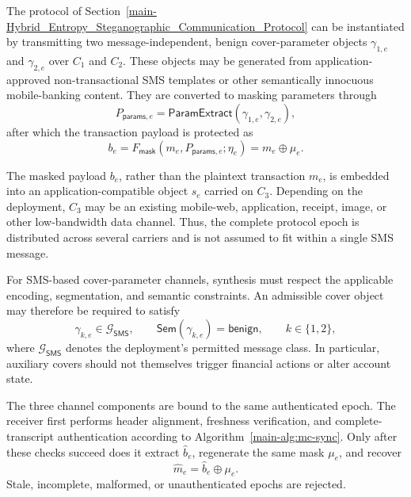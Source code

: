 \documentclass[journal]{IEEEtran}
\theoremstyle{definition}
\theoremstyle{game}
\begin{document}
The protocol of
Section~\ref{main-Hybrid_Entropy_Steganographic_Communication_Protocol}
can be instantiated by transmitting two message-independent,
benign cover-parameter objects
$\gamma_{1,e}$ and $\gamma_{2,e}$ over $C_1$ and $C_2$.
These objects may be generated from application-approved
non-transactional SMS templates or other semantically innocuous
mobile-banking content. They are converted to masking parameters
through
\begin{equation}
P_{\mathsf{params},e}
=
\mathsf{ParamExtract}
\left(
\gamma_{1,e},\gamma_{2,e}
\right),
\end{equation}
after which the transaction payload is protected as
\begin{equation}
b_e
=
F_{\mathsf{mask}}
\left(
m_e,P_{\mathsf{params},e};\eta_e
\right)
=
m_e\oplus\mu_e .
\label{eq:sms-masked-payload}
\end{equation}

The masked payload $b_e$, rather than the plaintext transaction
$m_e$, is embedded into an application-compatible object $s_e$
carried on $C_3$. Depending on the deployment, $C_3$ may be an
existing mobile-web, application, receipt, image, or other
low-bandwidth data channel. Thus, the complete protocol epoch is
distributed across several carriers and is not assumed to fit
within a single SMS message.

For SMS-based cover-parameter channels, synthesis must respect
the applicable encoding, segmentation, and semantic constraints.
An admissible cover object may therefore be required to satisfy
\begin{equation}
\gamma_{k,e}\in\mathcal{G}_{\mathsf{SMS}},
\qquad
\mathsf{Sem}(\gamma_{k,e})=\mathsf{benign},
\qquad
k\in\{1,2\},
\label{eq:sms-admissibility}
\end{equation}
where $\mathcal{G}_{\mathsf{SMS}}$ denotes the deployment's
permitted message class. In particular, auxiliary covers should
not themselves trigger financial actions or alter account state.

The three channel components are bound to the same authenticated
epoch. The receiver first performs header alignment, freshness
verification, and complete-transcript authentication according to
Algorithm~\ref{main-alg:mc-sync}. Only after these checks succeed
does it extract $\widehat b_e$, regenerate the same mask
$\mu_e$, and recover
\begin{equation}
\widehat m_e
=
\widehat b_e\oplus\mu_e .
\end{equation}
Stale, incomplete, malformed, or unauthenticated epochs are
rejected.
\end{document}
